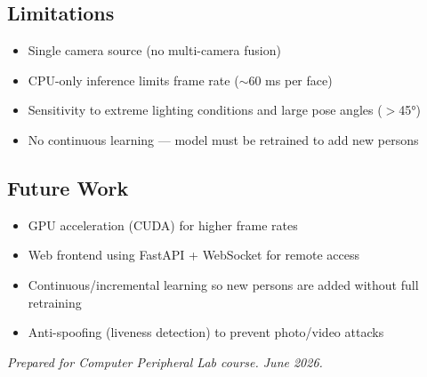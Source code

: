 \documentclass[12pt,a4paper]{article}
\begin{document}
\subsection*{Limitations}
\begin{itemize}
    \item Single camera source (no multi-camera fusion)
    \item CPU-only inference limits frame rate ($\sim$60 ms per face)
    \item Sensitivity to extreme lighting conditions and large pose angles ($>$45°)
    \item No continuous learning --- model must be retrained to add new persons
\end{itemize}

\subsection*{Future Work}
\begin{itemize}
    \item GPU acceleration (CUDA) for higher frame rates
    \item Web frontend using FastAPI + WebSocket for remote access
    \item Continuous/incremental learning so new persons are added without full retraining
    \item Anti-spoofing (liveness detection) to prevent photo/video attacks
\end{itemize}

\vfill
\noindent\textit{Prepared for Computer Peripheral Lab course. June 2026.}
\end{document}
